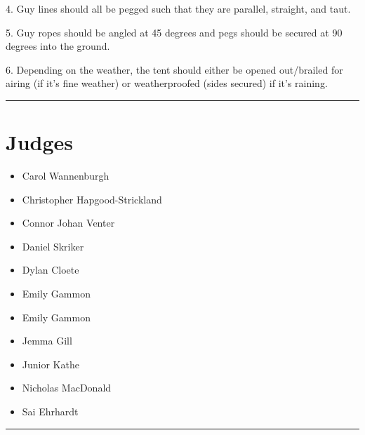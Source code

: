 \documentclass[10pt]{article}
\begin{document}
4. Guy lines should all be pegged such that they are parallel, straight, and taut.

5. Guy ropes should be angled at 45 degrees and pegs should be secured at 90 degrees into the ground.

6. Depending on the weather, the tent should either be opened out/brailed for airing (if it's fine weather) or weatherproofed (sides secured) if it's raining.
\vspace{0.5cm}
	\hrule
	\vspace{0.5cm}
		\section*{\faUsers \: Judges}

		

	\begin{multicols}{2}

		\begin{itemize}
									\item Carol Wannenburgh
									\item Christopher Hapgood-Strickland
									\item Connor Johan Venter
									\item Daniel Skriker
									\item Dylan Cloete
									\item Emily Gammon
						\end{itemize}

		\vfill\null
		\columnbreak

		\begin{itemize}
									\item Emily Gammon
									\item Jemma Gill
									\item Junior Kathe
									\item Nicholas MacDonald
									\item Sai Ehrhardt
						\end{itemize}

		\vfill\null

		\end{multicols}



			\vspace{0.5cm}
	\hrule
	\vspace{0.5cm}
\end{document}
